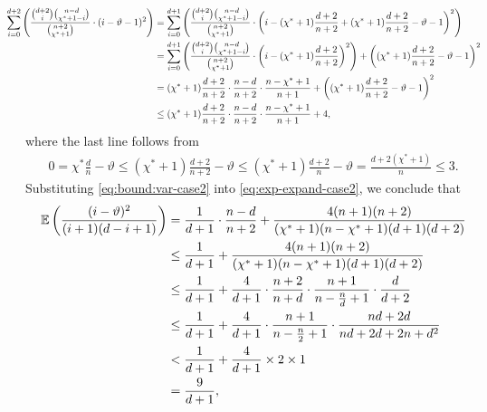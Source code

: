 \documentclass[onecolumn,letterpaper]{IEEEtran}
\newcommand{\plsize}{{\chi}}
\newcommand{\cE}{{\mathbb{E}}}
\newcommand{\mnp}{{\vartheta}}
\newcommand{\idex}{{i}}
\begin{document}
\begin{align}  
\kern-2em \sum \limits_{\idex=0}^{d+2} \left( \frac{\binom{d+2}{\idex}\binom{n-d}{\plsize^{*}+1-\idex}}{\binom{n+2}{\plsize^{*}+1}} \cdot (\idex-\mnp-1)^2 \right) 
    &= \sum \limits_{\idex=0}^{d+1} \left( \frac{\binom{d+2}{\idex}\binom{n-d}{\plsize^{*}+1-\idex}}{\binom{n+2}{\plsize^{*}+1}} \cdot \left( \idex-(\plsize^{*}+1)\frac{d+2}{n+2} + (\plsize^{*}+1)\frac{d+2}{n+2}-\mnp-1 \right)^2 \right) \notag\\
    &= \sum \limits_{\idex=0}^{d+1} \left( \frac{\binom{d+2}{\idex}\binom{n-d}{\plsize^{*}+1-\idex}}{\binom{n+2}{\plsize^{*}+1}} \cdot \left( \idex-(\plsize^{*}+1)\frac{d+2}{n+2}   \right)^2\right) + \left((\plsize^{*}+1)\frac{d+2}{n+2}-\mnp-1\right)^2\notag\\    
    &=  (\plsize^{*}+1)\frac{d+2}{n+2}\cdot \frac{n-d}{n+2}\cdot \frac{n-\plsize^{*}+1}{n+1} + \left((\plsize^{*}+1)\frac{d+2}{n+2}-\mnp-1\right)^2 \notag\\
    &\le (\plsize^{*}+1)\frac{d+2}{n+2}\cdot \frac{n-d}{n+2}\cdot \frac{n-\plsize^{*}+1}{n+1} + 4, \label{eq:bound:var-case2}
\end{align}
where the last line follows from 
\begin{align*}
   0=  \plsize^{*}\frac{d}{n}-\mnp \leq  (\plsize^{*}+1)\frac{d+2}{n+2}-\mnp \leq (\plsize^{*}+1)\frac{d+2}{n}-\mnp =\frac{d+2(\plsize^{*}+1)}{n}\leq 3.
\end{align*}
Substituting \eqref{eq:bound:var-case2} into \eqref{eq:exp-expand-case2}, we conclude that
\begin{align}
   \cE \left( \frac{(\idex-\mnp)^2}{(\idex+1)(d-\idex+1)} \right)    
   &= \frac{1 }{d+1}\cdot \frac{n-d}{n+2}  + \frac{4 (n+1)(n+2)}{(\plsize^{*}+1)(n-\plsize^{*}+1)(d+1)(d+2)}\notag\\
   &\le \frac{1 }{d+1} +  \frac{4(n+1)(n+2)}{(\plsize^{*}+1)(n-\plsize^{*}+1)(d+1)(d+2)}\notag\\
    &\leq \frac{1 }{d+1} + \frac{4 }{d+1}\cdot \frac{n+2}{n+d}\cdot \frac{n+1}{n-\frac{n}{d}+1}\cdot \frac{d}{d+2} \notag\\
    &\le \frac{1 }{d+1} + \frac{4 }{d+1}\cdot  \frac{n+1}{n-\frac{n}{2}+1}\cdot \frac{nd+2d}{nd+2d+2n+d^2} \notag\\
    &< \frac{1 }{d+1} + \frac{4 }{d+1} \times 2 \times 1 \notag\\
    &= \frac{9}{d+1}, \label{eq:mt:le_3_9}
\end{align}
\end{document}

